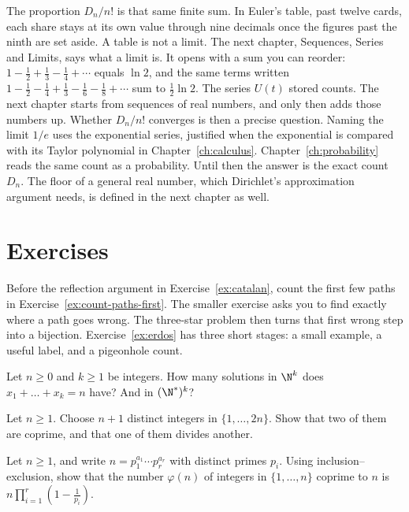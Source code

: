 The proportion $D_n/n!$ is that same finite sum. In Euler's table, past twelve cards, each share stays at its own value through nine decimals once the figures past the ninth are set aside. A table is not a limit. The next chapter, Sequences, Series and Limits, says what a limit is. It opens with a sum you can reorder: $1-\frac12+\frac13-\frac14+\cdots$ equals $\ln 2$, and the same terms written $1-\frac12-\frac14+\frac13-\frac16-\frac18+\cdots$ sum to $\frac12\ln 2$. The series $U(t)$ stored counts. The next chapter starts from sequences of real numbers, and only then adds those numbers up. Whether $D_n/n!$ converges is then a precise question. Naming the limit $1/e$ uses the exponential series, justified when the exponential is compared with its Taylor polynomial in Chapter~\ref{ch:calculus}. Chapter~\ref{ch:probability} reads the same count as a probability. Until then the answer is the exact count $D_n$. The floor of a general real number, which Dirichlet's approximation argument needs, is defined in the next chapter as well.

\section{Exercises}
Before the reflection argument in Exercise~\ref{ex:catalan}, count the first few
paths in Exercise~\ref{ex:count-paths-first}. The smaller exercise asks you to
find exactly where a path goes wrong. The three-star problem then turns that
first wrong step into a bijection. Exercise~\ref{ex:erdos} has three short
stages: a small example, a useful label, and a pigeonhole count.

\begin{exercise}[$\star$]\label{ex:stars}
Let $n\ge0$ and $k\ge1$ be integers. How many solutions in $\N^k$ does $x_1+\dots+x_k=n$ have? And in $(\N^*)^k$?
\end{exercise}

\begin{exercise}[$\star\star$]\label{ex:pigeon}
Let $n\ge1$. Choose $n+1$ distinct integers in $\{1,\dots,2n\}$. Show that two of them are coprime, and that one of them divides another.
\end{exercise}

\begin{exercise}[$\star\star$]\label{ex:phi}
Let $n\ge1$, and write $n=p_1^{a_1}\cdots p_r^{a_r}$ with distinct primes $p_i$. Using inclusion--exclusion, show that the number $\varphi(n)$ of integers in $\{1,\dots,n\}$ coprime to $n$ is
$n\prod_{i=1}^r\left(1-\frac1{p_i}\right)$.
\end{exercise}

